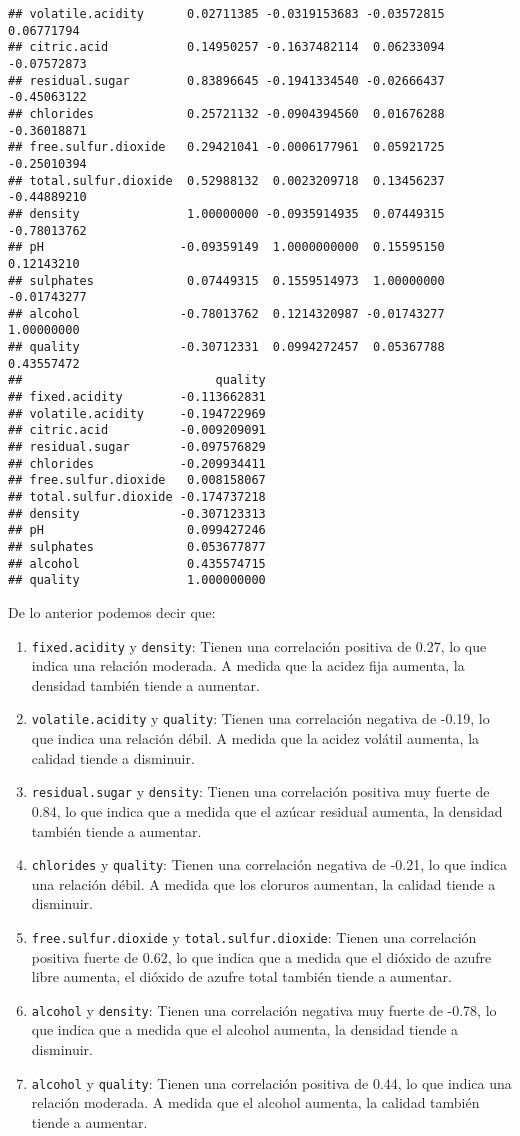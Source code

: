 \documentclass[
]{article}
\begin{document}
\begin{verbatim}
## volatile.acidity      0.02711385 -0.0319153683 -0.03572815  0.06771794
## citric.acid           0.14950257 -0.1637482114  0.06233094 -0.07572873
## residual.sugar        0.83896645 -0.1941334540 -0.02666437 -0.45063122
## chlorides             0.25721132 -0.0904394560  0.01676288 -0.36018871
## free.sulfur.dioxide   0.29421041 -0.0006177961  0.05921725 -0.25010394
## total.sulfur.dioxide  0.52988132  0.0023209718  0.13456237 -0.44889210
## density               1.00000000 -0.0935914935  0.07449315 -0.78013762
## pH                   -0.09359149  1.0000000000  0.15595150  0.12143210
## sulphates             0.07449315  0.1559514973  1.00000000 -0.01743277
## alcohol              -0.78013762  0.1214320987 -0.01743277  1.00000000
## quality              -0.30712331  0.0994272457  0.05367788  0.43557472
##                           quality
## fixed.acidity        -0.113662831
## volatile.acidity     -0.194722969
## citric.acid          -0.009209091
## residual.sugar       -0.097576829
## chlorides            -0.209934411
## free.sulfur.dioxide   0.008158067
## total.sulfur.dioxide -0.174737218
## density              -0.307123313
## pH                    0.099427246
## sulphates             0.053677877
## alcohol               0.435574715
## quality               1.000000000
\end{verbatim}

De lo anterior podemos decir que:

\begin{enumerate}
\def\labelenumi{\arabic{enumi}.}
\item
  \texttt{fixed.acidity} y \texttt{density}: Tienen una correlación
  positiva de 0.27, lo que indica una relación moderada. A medida que la
  acidez fija aumenta, la densidad también tiende a aumentar.
\item
  \texttt{volatile.acidity} y \texttt{quality}: Tienen una correlación
  negativa de -0.19, lo que indica una relación débil. A medida que la
  acidez volátil aumenta, la calidad tiende a disminuir.
\item
  \texttt{residual.sugar} y \texttt{density}: Tienen una correlación
  positiva muy fuerte de 0.84, lo que indica que a medida que el azúcar
  residual aumenta, la densidad también tiende a aumentar.
\item
  \texttt{chlorides} y \texttt{quality}: Tienen una correlación negativa
  de -0.21, lo que indica una relación débil. A medida que los cloruros
  aumentan, la calidad tiende a disminuir.
\item
  \texttt{free.sulfur.dioxide} y \texttt{total.sulfur.dioxide}: Tienen
  una correlación positiva fuerte de 0.62, lo que indica que a medida
  que el dióxido de azufre libre aumenta, el dióxido de azufre total
  también tiende a aumentar.
\item
  \texttt{alcohol} y \texttt{density}: Tienen una correlación negativa
  muy fuerte de -0.78, lo que indica que a medida que el alcohol
  aumenta, la densidad tiende a disminuir.
\item
  \texttt{alcohol} y \texttt{quality}: Tienen una correlación positiva
  de 0.44, lo que indica una relación moderada. A medida que el alcohol
  aumenta, la calidad también tiende a aumentar.
\end{enumerate}
\end{document}
